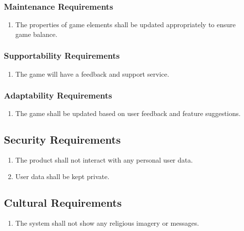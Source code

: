 \documentclass[12pt, titlepage]{article}
\begin{document}
\subsubsection{Maintenance Requirements}
\label{ssub:maintenance_requirements}
\begin{enumerate}[{MS}1. ]
	\item The properties of game elements shall be updated appropriately to ensure game balance.
\end{enumerate}

\subsubsection{Supportability Requirements}
\label{ssub:supportability_requirements}
\begin{enumerate}[{MS}1. ]
	\item The game will have a feedback and support service.
\end{enumerate}

\subsubsection{Adaptability Requirements}
\label{ssub:adaptability_requirements}
\begin{enumerate}[{MS}1. ]
	\item The game shall be updated based on user feedback and feature suggestions.
\end{enumerate}




\subsection{Security Requirements}
\begin{enumerate}[{SR}1. ]
	\item  The product shall not interact with any personal user data.
	\item  User data shall be kept private.
\end{enumerate}

\subsection{Cultural Requirements}
\begin{enumerate}[{CR}1. ]
	\item The system shall not show any religious imagery or messages.
\end{enumerate}
\end{document}
